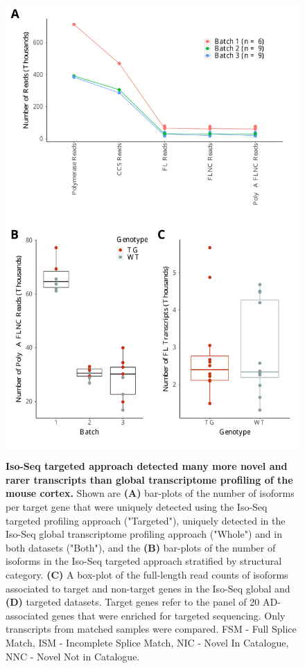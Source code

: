 \begin{figure}[!htp]
	\centering
	\includegraphics[page=3,trim={0 1.5cm 0 0cm},clip,scale = 0.50]{Figures/TargetedTranscriptome.pdf}
	\label{fig:targeted_vs_whole}
	\captionsetup{width=0.95\textwidth}
	\caption[Comparison of Iso-Seq global transcriptome and targeted profiling]%
	{\textbf{Iso-Seq targeted approach detected many more novel and rarer transcripts than global transcriptome profiling of the mouse cortex.} Shown are \textbf{(A)} bar-plots of the number of isoforms per target gene that were uniquely detected using the Iso-Seq targeted profiling approach ("Targeted"), uniquely detected in the Iso-Seq global transcriptome profiling approach ("Whole") and in both datasets ("Both"), and the \textbf{(B)} bar-plots of the number of isoforms in the Iso-Seq targeted approach stratified by structural category. \textbf{(C)} A box-plot of the full-length read counts of isoforms associated to target and non-target genes in the Iso-Seq global and \textbf{(D)} targeted datasets. Target genes refer to the panel of 20 AD-associated genes that were enriched for targeted sequencing. Only transcripts from matched samples were compared. FSM - Full Splice Match, ISM - Incomplete Splice Match, NIC - Novel In Catalogue, NNC - Novel Not in Catalogue.}
\end{figure}


